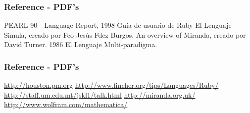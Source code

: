 \documentclass{beamer}
\begin{document}
\begin{frame}
 \frametitle{Reference - PDF's}
\begin{thebibliography}{10}
PEARL 90 - Language Report, 1998
Guía de usuario de Ruby
El Lenguaje Simula, creado por Fco Jesús Fdez Burgos.
An overview of Miranda, creado por David Turner. 1986
El Lenguaje Multi-paradigma.
\end{thebibliography}
\end{frame}

\begin{frame}
 \frametitle{Reference - PDF's}
\begin{thebibliography}{10}
\url{http://houston.pm.org}
\url{http://www.fincher.org/tips/Languages/Ruby/}
 \url{http://staff.um.edu.mt/jskl1/talk.html}
 \url{http://miranda.org.uk/}
\url{http://www.wolfram.com/mathematica/}\end{thebibliography}
\end{frame}
\end{document}
